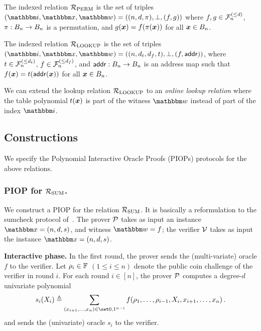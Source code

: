 \begin{definition}
    The indexed relation ${\mathcal{R}}_{\text{PERM}}$ is the set of triples $(\idxR, \instR, \witR)=
    ((n, d, \perm), \bot, (f, g))$ where $f, g \in {\mathcal{F}}_{n}^{(\le{d})}$, $\pi : B_{n} \rightarrow B_{n}$
    is a permutation, and $g(\boldsymbol{x}) = f(\pi(\boldsymbol{x}))$ for all $\boldsymbol{x} \in B_{n}$.
\end{definition}

\begin{definition}
    The indexed relation ${\mathcal{R}}_{\text{LOOKUP}}$ is the set of triples $(\idxR, \instR, \witR)=
    ((n, d_t, d_f, t), \bot, (f, \addr))$, where $t \in {\mathcal{F}}_{n}^{(\le{d_t})}$, $f \in {\mathcal{F}}_{n}^{(\le{d_f})}$,
    and $\mathsf{addr}: B_{n} \rightarrow B_{n}$ is an address map such that 
    $f(\boldsymbol{x}) = t(\mathsf{addr}(\boldsymbol{x}))$ for all $\boldsymbol{x} \in B_{n}$.
\end{definition}

\begin{remark}
    We can extend the lookup relation ${\mathcal{R}}_{\text{LOOKUP}}$ to an \emph{online lookup relation}
    where the table polynomial $t(\boldsymbol{x})$ is part of the witness $\witR$ 
    instead of part of the index $\idxR$.
\end{remark}

\subsection{Constructions}
We specify the Polynomial Interactive Oracle Proofs (PIOPs) protocols for the above relations.

\subsubsection*{PIOP for ${\mathcal{R}}_{\text{SUM}}$.} We construct a PIOP for 
the relation ${\mathcal{R}}_{\text{SUM}}$. It is basically a reformulation to the sumcheck protocol
of~\cite{LFKN92}.
The prover $\mathcal{P}$ takes as input an instance $\instR = (n, d, s)$,
and witness $\witR = f$; the verifier $\mathcal{V}$ takes as input the 
instance $\instR = (n, d, s)$.

\textbf{Interactive phase.} 
In the first round, the prover sends the (multi-variate) oracle $f$ to the verifier.
Let $\rho_{i} \in \mathbb{F}$ $(1 \le i \le n)$ denote the public coin challenge
of the verifier in round $i$.
For each round $i \in [n]$, the prover $\mathcal{P}$ computes a 
degree-$d$ univariate polynomial
\[
      s_i(X_i) \deq 
      \sum_{ (x_{i+1}, \dots, x_{n}) \in \zo^{n-i} } 
      f(\chal{1}, \dots, \chal{i-1}, X_i, x_{i+1}, \dots, x_n) \,.
\]
and sends the (univariate) oracle $s_i$ to the verifier.

